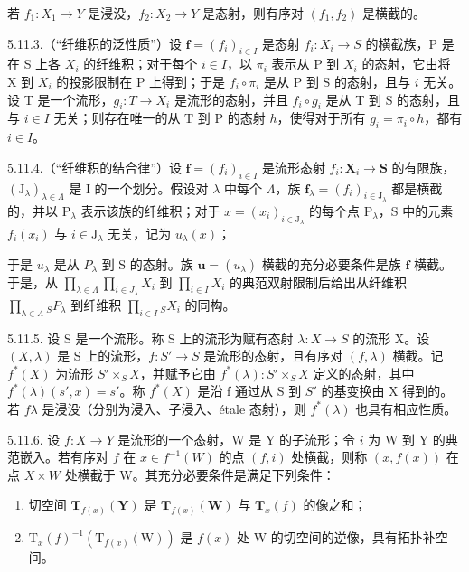 若 \(f_{1}: X_{1} \to Y\) 是浸没，\(f_{2}: X_{2} \to Y\) 是态射，则有序对 \((f_{1}, f_{2})\) 是横截的。

5.11.3.（“纤维积的泛性质”）设 \(\mathbf{f} = (f_i)_{i \in I}\) 是态射 \(f_i: X_i \to S\) 的横截族，P 是在 S 上各 \(X_i\) 的纤维积；对于每个 \(i \in I\)，以 \(\pi_i\) 表示从 P 到 \(X_i\) 的态射，它由将 X 到 \(X_i\) 的投影限制在 P 上得到；于是 \(f_i \circ \pi_i\) 是从 P 到 S 的态射，且与 \(i\) 无关。设 T 是一个流形，\(g_i: T \to X_i\) 是流形的态射，并且 \(f_i \circ g_i\) 是从 T 到 S 的态射，且与 \(i \in I\) 无关；则存在唯一的从 T 到 P 的态射 \(h\)，使得对于所有 \(g_i = \pi_i \circ h\)，都有 \(i \in I\)。

5.11.4.（“纤维积的结合律”）设 \(\mathbf{f} = (f_i)_{i \in I}\) 是流形态射 \(f_i: \mathbf{X}_i \to \mathbf{S}\) 的有限族，\((\mathrm{J}_{\lambda})_{\lambda \in \Lambda}\) 是 I 的一个划分。假设对 \(\lambda\) 中每个 \(\Lambda\)，族 \(\mathbf{f}_{\lambda} = (f_i)_{i \in \mathrm{J}_{\lambda}}\) 都是横截的，并以 \(\mathrm{P}_{\lambda}\) 表示该族的纤维积；对于 \(x = (x_i)_{i \in \mathrm{J}_{\lambda}}\) 的每个点 \(\mathrm{P}_{\lambda}\)，S 中的元素 \(f_i(x_i)\) 与 \(i \in \mathrm{J}_{\lambda}\) 无关，记为 \(u_{\lambda}(x)\)；

于是 \(u_{\lambda}\) 是从 \(P_{\lambda}\) 到 S 的态射。族 \(\mathbf{u} = (u_{\lambda})\) 横截的充分必要条件是族 \(\mathbf{f}\) 横截。于是，从 \(\prod_{\lambda \in \Lambda} \prod_{i \in J_{\lambda}} X_i\) 到 \(\prod_{i \in I} X_i\) 的典范双射限制后给出从纤维积 \(\prod_{\lambda \in \Lambda} {}_{S}P_{\lambda}\) 到纤维积 \(\prod_{i \in I} {}_{S}X_i\) 的同构。

5.11.5. 设 S 是一个流形。称 S 上的流形为赋有态射 \(\lambda: X \to S\) 的流形 X。设 \((X, \lambda)\) 是 S 上的流形，\(f: S' \to S\) 是流形的态射，且有序对 \((f, \lambda)\) 横截。记 \(f^*(X)\) 为流形 \(S' \times_{S} X\)，并赋予它由 \(f^*(\lambda): S' \times_{S} X\) 定义的态射，其中 \(f^*(\lambda)(s', x) = s'\)。称 \(f^*(X)\) 是沿 f 通过从 S 到 \(S'\) 的基变换由 X 得到的。若 \(f\)\(\lambda\) 是浸没（分别为浸入、子浸入、étale 态射），则 \(f^*(\lambda)\) 也具有相应性质。

5.11.6. 设 \(f: X \to Y\) 是流形的一个态射，W 是 Y 的子流形；令 \(i\) 为 W 到 Y 的典范嵌入。若有序对 \(f\) 在 \(x \in f^{-1}(W)\) 的点 \((f, i)\) 处横截，则称 \((x, f(x))\) 在点 \(X \times W\) 处横截于 W。其充分必要条件是满足下列条件：

\begin{enumerate}
\def\labelenumi{(\roman{enumi})}
\item
  切空间 \(\mathbf{T}_{f(x)}(\mathbf{Y})\) 是 \(\mathbf{T}_{f(x)}(\mathbf{W})\) 与 \(\mathbf{T}_{x}(f)\) 的像之和；
\item
\(\mathrm{T}_{x}(f)^{-1}(\mathrm{T}_{f(x)}(\mathrm{W}))\) 是 \(f(x)\) 处 W 的切空间的逆像，具有拓扑补空间。
\end{enumerate}

